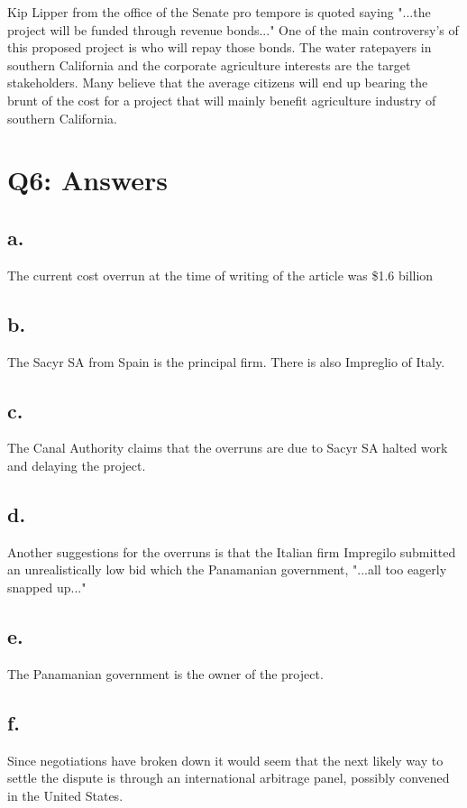\documentclass[12pt]{article}
\renewcommand{\=}[1]{\stackrel{#1}{=}} %
\theoremstyle{definition}
\theoremstyle{remark}
\begin{document}
Kip Lipper from the office of the Senate pro tempore is quoted saying "...the project will be funded through revenue bonds..." One of the main controversy's of this proposed project is who will repay those bonds. The water ratepayers in southern California and the corporate agriculture interests are the target stakeholders. Many believe that the average citizens will end up bearing the brunt of the cost for a project that will mainly benefit agriculture industry of southern California.
\section{Q6: Answers}

\subsection{a.}
The current cost overrun at the time of writing of the article was \$1.6 billion 

\subsection{b.}
The Sacyr SA from Spain is the principal firm. There is also Impreglio of Italy.

\subsection{c.}
The Canal Authority claims that the overruns are due to Sacyr SA halted work and delaying the project.

\subsection{d.}
Another suggestions for the overruns is that the Italian firm Impregilo submitted an unrealistically low bid which the Panamanian government, "...all too eagerly snapped up..."

\subsection{e.}
The Panamanian government is the owner of the project.

\subsection{f.}
Since negotiations have broken down it would seem that the next likely way to settle the dispute is through an international arbitrage panel, possibly convened in the United States.
\end{document}
